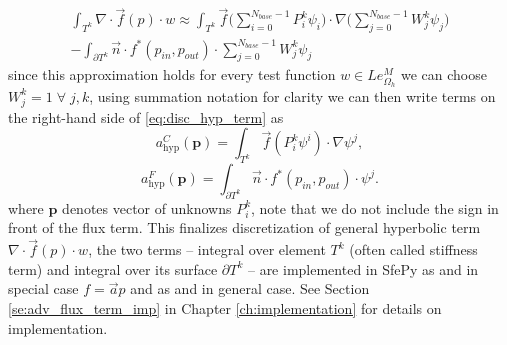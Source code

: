 \begin{multline}
	\label{eq:disc_hyp_term}
	\int_{T^k} \nabla\cdot \vec{f}(p)\cdot w \approx \int_{T^k} 
	\vec{f}\Big(\sum\limits_{i=0}^{N_{base} - 1} 
	P_i^k\psi_i\Big)\cdot\nabla\Big(\sum\limits_{j=0}^{N_{base} - 1} 
	W_j^k\psi_j\Big)\\	
	-\int_{\partial{T^k}} \vec{n} \cdot f^{*} (p_{in}, p_{out})\cdot 
	\sum\limits_{j=0}^{N_{base} - 1} W_j^k\psi_j
\end{multline}
since this approximation holds for every test function $w \in 
Le_{\Omega_h}^{M}$ we can choose $W_j^k = 1 \; \forall \; 
j, k$, using summation notation for clarity we can then write terms on the  right-hand 
side of \eqref{eq:disc_hyp_term} as 
\begin{equation}\label{eq:hyp_stiff_app}
		a^C_\mathrm{hyp}(\mathbf{p}) = \int_{T^k} \vec{f}(P_i^k\psi^i)\cdot\nabla\psi^j, 
\end{equation}
\begin{equation}\label{eq:hyp_flux_app}
	a^F_\mathrm{hyp}(\mathbf{p}) = \int_{\partial{T^k}} \vec{n} \cdot f^{*} (p_{in}, 
	p_{out})\cdot\psi^j.
\end{equation}
where $\mathbf{p}$ denotes vector of unknowns $P^k_i$, note that we do not include the 
sign in front of the flux term.
This finalizes discretization of general hyperbolic term $\nabla\cdot\vec{f}(p) 
\cdot w$, the two terms -- integral over element $T^k$ (often called stiffness 
term) and integral over its surface $\partial T^k$ -- are implemented in SfePy 
as  and  in special 
case $f = \vec{a}p$ and as  and 
 in general case. See Section 
\ref{se:adv_flux_term_imp} in Chapter \ref{ch:implementation} for details on 
implementation.


